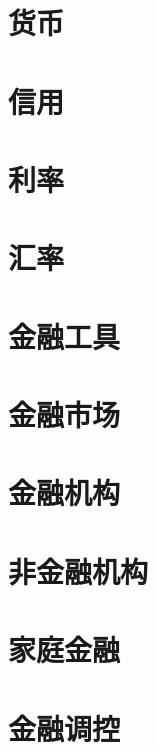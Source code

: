 \documentclass[12pt]{book}
\begin{document}
\chapter{货币}




\chapter{信用}




\chapter{利率}




\chapter{汇率}




\chapter{金融工具}




\chapter{金融市场}




\chapter{金融机构}




\chapter{非金融机构}




\chapter{家庭金融}




\chapter{金融调控}
\end{document}
